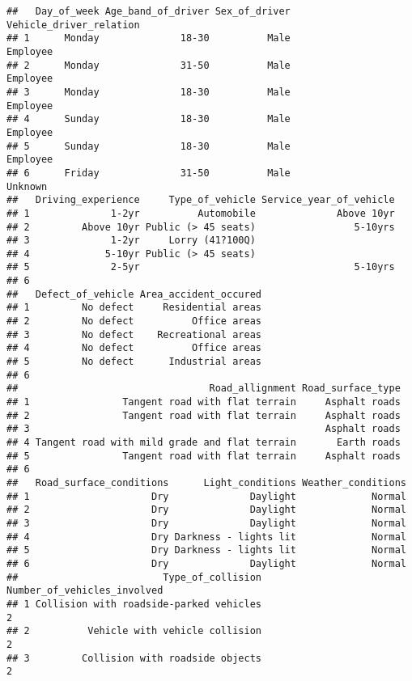 \documentclass[
]{article}
\begin{document}
\begin{verbatim}
##   Day_of_week Age_band_of_driver Sex_of_driver Vehicle_driver_relation
## 1      Monday              18-30          Male                Employee
## 2      Monday              31-50          Male                Employee
## 3      Monday              18-30          Male                Employee
## 4      Sunday              18-30          Male                Employee
## 5      Sunday              18-30          Male                Employee
## 6      Friday              31-50          Male                 Unknown
##   Driving_experience     Type_of_vehicle Service_year_of_vehicle
## 1              1-2yr          Automobile              Above 10yr
## 2         Above 10yr Public (> 45 seats)                 5-10yrs
## 3              1-2yr     Lorry (41?100Q)                        
## 4             5-10yr Public (> 45 seats)                        
## 5              2-5yr                                     5-10yrs
## 6                                                               
##   Defect_of_vehicle Area_accident_occured
## 1         No defect     Residential areas
## 2         No defect          Office areas
## 3         No defect    Recreational areas
## 4         No defect          Office areas
## 5         No defect      Industrial areas
## 6                                        
##                                 Road_allignment Road_surface_type
## 1                Tangent road with flat terrain     Asphalt roads
## 2                Tangent road with flat terrain     Asphalt roads
## 3                                                   Asphalt roads
## 4 Tangent road with mild grade and flat terrain       Earth roads
## 5                Tangent road with flat terrain     Asphalt roads
## 6                                                                
##   Road_surface_conditions      Light_conditions Weather_conditions
## 1                     Dry              Daylight             Normal
## 2                     Dry              Daylight             Normal
## 3                     Dry              Daylight             Normal
## 4                     Dry Darkness - lights lit             Normal
## 5                     Dry Darkness - lights lit             Normal
## 6                     Dry              Daylight             Normal
##                         Type_of_collision Number_of_vehicles_involved
## 1 Collision with roadside-parked vehicles                           2
## 2          Vehicle with vehicle collision                           2
## 3         Collision with roadside objects                           2

\end{verbatim}
\end{document}
